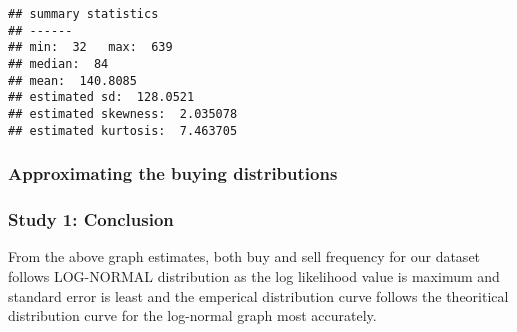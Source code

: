 \documentclass[]{article}
\newenvironment{Shaded}{\begin{snugshade}}{\end{snugshade}}
\newcommand{\KeywordTok}[1]{\textcolor[rgb]{0.13,0.29,0.53}{\textbf{#1}}}
\newcommand{\DataTypeTok}[1]{\textcolor[rgb]{0.13,0.29,0.53}{#1}}
\newcommand{\StringTok}[1]{\textcolor[rgb]{0.31,0.60,0.02}{#1}}
\newcommand{\CommentTok}[1]{\textcolor[rgb]{0.56,0.35,0.01}{\textit{#1}}}
\newcommand{\OperatorTok}[1]{\textcolor[rgb]{0.81,0.36,0.00}{\textbf{#1}}}
\newcommand{\NormalTok}[1]{#1}
\begin{document}
\begin{verbatim}
## summary statistics
## ------
## min:  32   max:  639 
## median:  84 
## mean:  140.8085 
## estimated sd:  128.0521 
## estimated skewness:  2.035078 
## estimated kurtosis:  7.463705
\end{verbatim}

\subsubsection{Approximating the buying
distributions}\label{approximating-the-buying-distributions}

\begin{Shaded}
\end{Shaded}

\subsubsection{Study 1: Conclusion}\label{study-1-conclusion}

From the above graph estimates, both buy and sell frequency for our
dataset follows LOG-NORMAL distribution as the log likelihood value is
maximum and standard error is least and the emperical distribution curve
follows the theoritical distribution curve for the log-normal graph most
accurately.
\end{document}
